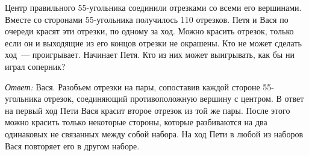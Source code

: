 \problem
Центр правильного 55-угольника соединили отрезками со всеми его вершинами.
Вместе со сторонами 55-угольника получилось 110 отрезков.
Петя и Вася по очереди красят эти отрезки, по одному за ход.
Можно красить отрезок, только если он и выходящие из его концов отрезки не
окрашены.
Кто не может сделать ход~--- проигрывает.
Начинает Петя.
Кто из них может выигрывать, как бы ни играл соперник?

\solution
\emph{Ответ:} Вася.
Разобьем отрезки на пары, сопоставив каждой стороне 55-уголь\-ника отрезок,
соединяющий противоположную вершину с центром.
В ответ на первый ход Пети Вася красит второе отрезок из той же пары.
После этого можно красить только некоторые стороны, которые разбиваются на два
одинаковых не связанных между собой набора.
На ход Пети в любой из наборов Вася повторяет его в другом наборе.
\endproblem
